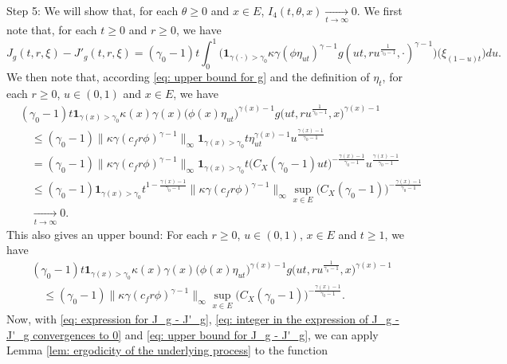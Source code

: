\documentclass[12pt, a4paper]{amsart}
\theoremstyle{definition}
\numberwithin{equation}{section}
\begin{document}
	Step 5: We will show that, for each $\theta \geq 0$ and $x\in E$, $I_4(t,\theta,x) \xrightarrow[t\to \infty]{} 0$.
	We first note that, for each $t\geq 0$ and $r\geq 0$, we have
\[\label{eq: expression for J_g - J'_g}
	J_g(t,r,\xi) - J'_g(t,r,\xi)
	= (\gamma_0 - 1)t\int_0^1 \big( \mathbf 1_{\gamma(\cdot )> \gamma_0}  \kappa\gamma (   \phi \eta_{ut}   )^{\gamma - 1} g (ut,ru^{\frac{1}{\gamma_0 - 1}},\cdot )^{\gamma-1}  \big) \big(  \xi_{(1-u)t}  \big) du.
\]
	We then note that, according \eqref{eq: upper bound for g} and the definition of $\eta_t$, for each $r\geq 0$, $u\in (0,1)$ and $x\in E$, we have
\[\label{eq: integer in the expression of J_g - J'_g convergences to 0}\begin{split}
	&(\gamma_0 - 1)t  \mathbf 1_{\gamma(x)> \gamma_0}  \kappa(x)\gamma(x) \big(   \phi(x) \eta_{ut}   \big)^{\gamma(x) - 1} g \big(ut,ru^{\frac{1}{\gamma_0 - 1}},x \big)^{\gamma(x)-1}
	\\&\quad \leq (\gamma_0 - 1) \big\| \kappa \gamma (c_f r\phi)^{\gamma - 1}\big\|_\infty \mathbf 1_{\gamma(x) > \gamma_0} t \eta_{ut}^{\gamma(x) - 1} u^{\frac{\gamma(x) - 1}{\gamma_0 - 1}}
	\\&\quad = (\gamma_0 - 1) \big\| \kappa \gamma (c_f r\phi)^{\gamma - 1}\big\|_\infty \mathbf 1_{\gamma(x) > \gamma_0} t \big( C_X(\gamma_0 - 1) ut\big)^{-\frac{\gamma(x) - 1}{\gamma_0 - 1}} u^{\frac{\gamma(x) - 1}{\gamma_0 - 1}}
	\\&\quad \leq (\gamma_0 - 1) \mathbf 1_{\gamma(x) > \gamma_0} t^{1-\frac{\gamma(x) - 1}{\gamma_0 - 1}}\big\| \kappa \gamma (c_f r\phi)^{\gamma - 1}\big\|_\infty \sup_{x\in E} \big( C_X(\gamma_0 - 1) \big)^{-\frac{\gamma(x) - 1}{\gamma_0 - 1}}
	\\&\quad \xrightarrow[t\to \infty]{} 0.
\end{split}\]
	This also gives an upper bound: For each $r\geq 0$, $u \in (0,1)$, $x\in E$ and $t\geq 1$, we have
\[\label{eq: upper bound for the integrator of J_g - J'_g} \begin{split}
	&(\gamma_0 - 1)t  \mathbf 1_{\gamma(x)> \gamma_0}  \kappa(x)\gamma(x) \big(   \phi(x) \eta_{ut}   \big)^{\gamma(x) - 1} g \big(ut,ru^{\frac{1}{\gamma_0 - 1}},x \big)^{\gamma(x)-1}
	\\&\quad \leq (\gamma_0 - 1) \big\| \kappa \gamma (c_f r\phi)^{\gamma - 1}\big\|_\infty \sup_{x\in E} \big( C_X(\gamma_0 - 1) \big)^{-\frac{\gamma(x) - 1}{\gamma_0 - 1}}.
\end{split}\]
	Now, with \eqref{eq: expression for J_g - J'_g}, \eqref{eq: integer in the expression of J_g - J'_g convergences to 0} and \eqref{eq: upper bound for J_g - J'_g}, we can apply Lemma \ref{lem: ergodicity of the underlying process} to the function
\end{document}
